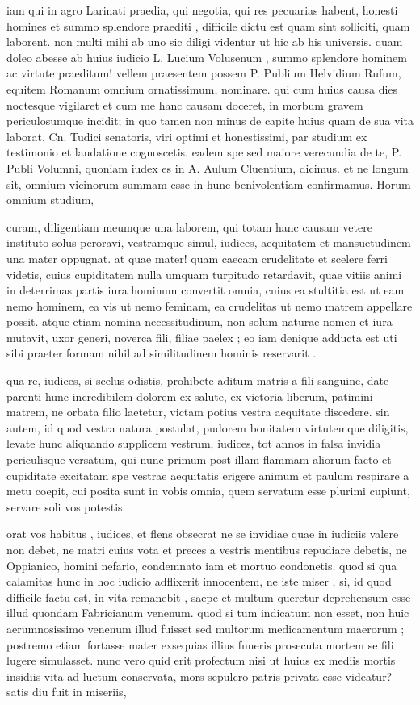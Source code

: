  iam qui in agro Larinati praedia, qui negotia, qui res pecuarias habent, honesti homines et summo splendore praediti , difficile dictu est quam sint solliciti, quam laborent. non multi mihi ab uno sic diligi videntur ut hic ab his universis. quam doleo abesse ab huius iudicio L. Lucium Volusenum , summo splendore hominem ac virtute praeditum! vellem praesentem possem P. Publium Helvidium Rufum, equitem Romanum omnium ornatissimum, nominare. qui cum huius causa dies noctesque vigilaret et cum me hanc causam doceret, in morbum gravem periculosumque incidit; in quo tamen non minus de capite huius quam de sua vita laborat. Cn. Tudici senatoris, viri optimi et honestissimi, par studium ex testimonio et laudatione cognoscetis. eadem spe sed maiore verecundia de te, P. Publi Volumni, quoniam iudex es in A. Aulum Cluentium, dicimus. et ne longum sit, omnium vicinorum summam esse in hunc benivolentiam confirmamus. Horum omnium studium,

 curam, diligentiam meumque una laborem, qui totam hanc causam vetere instituto solus peroravi, vestramque simul, iudices, aequitatem et mansuetudinem una mater oppugnat. at quae mater! quam caecam crudelitate et scelere ferri videtis, cuius cupiditatem nulla umquam turpitudo retardavit, quae vitiis animi in deterrimas partis iura hominum convertit omnia, cuius ea stultitia est ut eam nemo hominem, ea vis ut nemo feminam, ea crudelitas ut nemo matrem appellare possit. atque etiam nomina necessitudinum, non solum naturae nomen et iura mutavit, uxor generi, noverca fili, filiae paelex ; eo iam denique adducta est uti sibi praeter formam nihil ad similitudinem hominis reservarit .

 qua re, iudices, si scelus odistis, prohibete aditum matris a fili sanguine, date parenti hunc incredibilem dolorem ex salute, ex victoria liberum, patimini matrem, ne orbata filio laetetur, victam potius vestra aequitate discedere. sin autem, id quod vestra natura postulat, pudorem bonitatem virtutemque diligitis, levate hunc aliquando supplicem vestrum, iudices, tot annos in falsa invidia periculisque versatum, qui nunc primum post illam flammam aliorum facto et cupiditate excitatam spe vestrae aequitatis erigere animum et paulum respirare a metu coepit, cui posita sunt in vobis omnia, quem servatum esse plurimi cupiunt, servare soli vos potestis.

 orat vos habitus , iudices, et flens obsecrat ne se invidiae quae in iudiciis valere non debet, ne matri cuius vota et preces a vestris mentibus repudiare debetis, ne Oppianico, homini nefario, condemnato iam et mortuo condonetis. quod si qua calamitas hunc in hoc iudicio adflixerit innocentem, ne iste miser , si, id quod difficile factu est, in vita remanebit , saepe et multum queretur deprehensum esse illud quondam Fabricianum venenum. quod si tum indicatum non esset, non huic aerumnosissimo venenum illud fuisset sed multorum medicamentum maerorum ; postremo etiam fortasse mater exsequias illius funeris prosecuta mortem se fili lugere simulasset. nunc vero quid erit profectum nisi ut huius ex mediis mortis insidiis vita ad luctum conservata, mors sepulcro patris privata esse videatur? satis diu fuit in miseriis,

